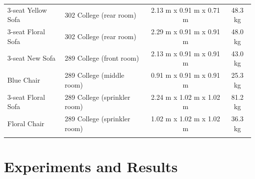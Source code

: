 \documentclass[12pt,oneside]{book}
\begin{document}
\begin{table}
\begin{tabular}{llcc}
		3-seat Yellow Sofa           &  302 College (rear room)          &  2.13 m x 0.91 m x 0.71 m  &  48.3 kg    \\
		3-seat Floral Sofa           &  302 College (rear room)          &  2.29 m x 0.91 m x 0.91 m  &  48.0 kg    \\
		3-seat New Sofa              &  289 College (front room)         &  2.13 m x 0.91 m x 0.91 m  &  43.0 kg    \\
		Blue Chair                   &  289 College (middle room)        &  0.91 m x 0.91 m x 0.91 m  &  25.3 kg    \\
		3-seat Floral Sofa           &  289 College (sprinkler room)     &  2.24 m x 1.02 m x 1.02 m  &  81.2 kg    \\
		Floral Chair                 &  289 College (sprinkler room)     &  1.02 m x 1.02 m x 1.02 m  &  36.3 kg    \\
		\noalign{\smallskip}\hline
	\end{tabular}
	\label{tab:Fuel_Masses}
\end{table}

\chapter{Experiments and Results}
\label{chap:Experiments_and_Results}
\end{document}
